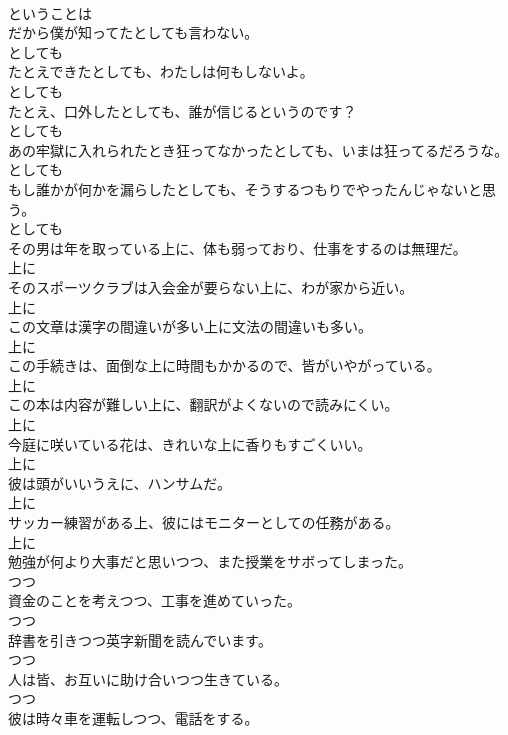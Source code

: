 \documentclass[8pt]{extreport}
\begin{document}
\begin{CJK}{UTF8}{min}
\\	ということは
\\	だから僕が知ってたとしても言わない。	
\\	としても
\\	たとえできたとしても、わたしは何もしないよ。	
\\	としても
\\	たとえ、口外したとしても、誰が信じるというのです？	
\\	としても
\\	あの牢獄に入れられたとき狂ってなかったとしても、いまは狂ってるだろうな。	
\\	としても
\\	もし誰かが何かを漏らしたとしても、そうするつもりでやったんじゃないと思う。	
\\	としても
\\	その男は年を取っている上に、体も弱っており、仕事をするのは無理だ。	
\\	上に
\\	そのスポーツクラブは入会金が要らない上に、わが家から近い。	
\\	上に
\\	この文章は漢字の間違いが多い上に文法の間違いも多い。	
\\	上に
\\	この手続きは、面倒な上に時間もかかるので、皆がいやがっている。	
\\	上に
\\	この本は内容が難しい上に、翻訳がよくないので読みにくい。	
\\	上に
\\	今庭に咲いている花は、きれいな上に香りもすごくいい。	
\\	上に
\\	彼は頭がいいうえに、ハンサムだ。	
\\	上に
\\	サッカー練習がある上、彼にはモニターとしての任務がある。	
\\	上に
\\	勉強が何より大事だと思いつつ、また授業をサボってしまった。	
\\	つつ
\\	資金のことを考えつつ、工事を進めていった。	
\\	つつ
\\	辞書を引きつつ英字新聞を読んでいます。	
\\	つつ
\\	人は皆、お互いに助け合いつつ生きている。	
\\	つつ
\\	彼は時々車を運転しつつ、電話をする。	

\end{CJK}
\end{document}
